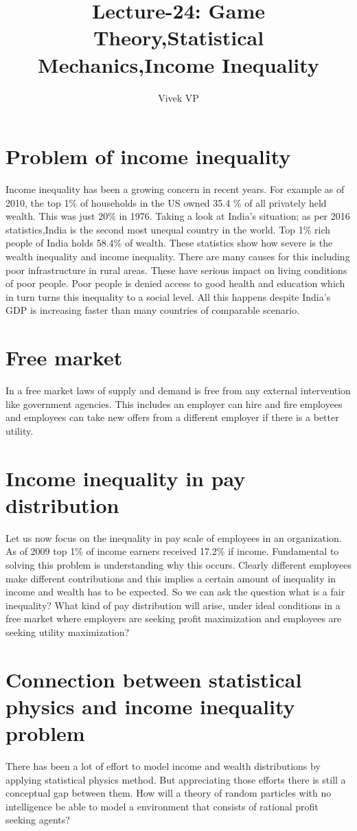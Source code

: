 \documentclass[letterpaper,english,10pt]{article}
\title{Lecture-24: Game Theory,Statistical Mechanics,Income Inequality}
\author{Vivek VP}
\begin{document}
\maketitle
\section{Problem of income inequality}
\cite{fairgame}
Income inequality has been a growing concern in recent years. For example as of 2010, the top 1\% of households in the US owned 35.4 \% of all privately held wealth. This was just 20\% in 1976. Taking a look at India's situation; as per 2016 statistics,India is the second most unequal country in the world. Top 1\% rich people of India holds 58.4\% of wealth. These statistics show how severe is the wealth inequality and income inequality. There are many causes for this including poor infrastructure in rural areas. These have serious impact on living conditions of poor people. Poor people is denied access to good health and education which in turn turns this inequality to a social level. All this happens despite India's GDP is increasing faster than many countries of comparable scenario.

\section{Free market}
In a free market laws of supply and demand is free from any external intervention like government agencies. This includes an employer can hire and fire employees and employees can take new offers from a different employer if there is a better utility. 

\section{Income inequality in pay distribution}
Let us now focus on  the inequality in pay scale of employees in an organization. As of 2009 top 1\% of income earners received 17.2\% if income. Fundamental to solving this problem is understanding why this occurs. Clearly different employees make different contributions and this implies a certain amount of  inequality in income and wealth has to be expected. So we can ask the question what is a fair inequality? What kind of pay distribution will arise, under ideal conditions in a free market where employers are seeking profit maximization and employees are seeking utility maximization?

\section{Connection between statistical physics and income inequality problem}
There has been a lot of effort to model income and wealth distributions by applying statistical physics method. But appreciating those efforts there is still a conceptual gap between them. How will a theory of random particles with no intelligence be able to model a environment that consists of rational profit seeking agents? 
\end{document}

